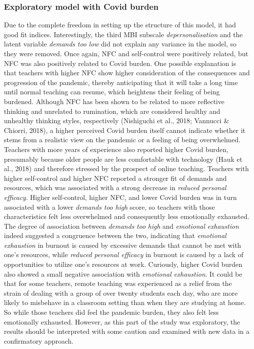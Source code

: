 \documentclass[
  english,
  man,floatsintext]{apa6}
\begin{document}
\hypertarget{exploratory-model-with-covid-burden}{%
\subsubsection{Exploratory model with Covid burden}\label{exploratory-model-with-covid-burden}}

Due to the complete freedom in setting up the structure of this model, it had good fit indices.
Interestingly, the third MBI subscale \emph{depersonalisation} and the latent variable \emph{demands too low} did not explain any variance in the model, so they were removed.
Once again, NFC and self-control were positively related, but NFC was also positively related to Covid burden.
One possible explanation is that teachers with higher NFC show higher consideration of the consequences and progression of the pandemic, thereby anticipating that it will take a long time until normal teaching can resume, which heightens their feeling of being burdened.
Although NFC has been shown to be related to more reflective thinking and unrelated to rumination, which are considered healthy and unhealthy thinking styles, respectively (Nishiguchi et al., 2018; Vannucci \& Chiorri, 2018), a higher perceived Covid burden itself cannot indicate whether it stems from a realistic view on the pandemic or a feeling of being overwhelmed.
Teachers with more years of experience also reported higher Covid burden, presumably because older people are less comfortable with technology (Hauk et al., 2018) and therefore stressed by the prospect of online teaching.
Teachers with higher self-control and higher NFC reported a stronger fit of demands and resources, which was associated with a strong decrease in \emph{reduced personal efficacy}.
Higher self-control, higher NFC, and lower Covid burden was in turn associated with a lower \emph{demands too high} score, so teachers with those characteristics felt less overwhelmed and consequently less emotionally exhausted.
The degree of association between \emph{demands too high} and \emph{emotional exhaustion} indeed suggested a congruence between the two, indicating that \emph{emotional exhaustion} in burnout is caused by excessive demands that cannot be met with one's resources, while \emph{reduced personal efficacy} in burnout is caused by a lack of opportunities to utilize one's resources at work.
Curiously, higher Covid burden also showed a small negative association with \emph{emotional exhaustion}.
It could be that for some teachers, remote teaching was experienced as a relief from the strain of dealing with a group of over twenty students each day, who are more likely to misbehave in a classroom setting than when they are studying at home.
So while those teachers did feel the pandemic burden, they also felt less emotionally exhausted.
However, as this part of the study was exploratory, the results should be interpreted with some caution and examined with new data in a confirmatory approach.
\end{document}
